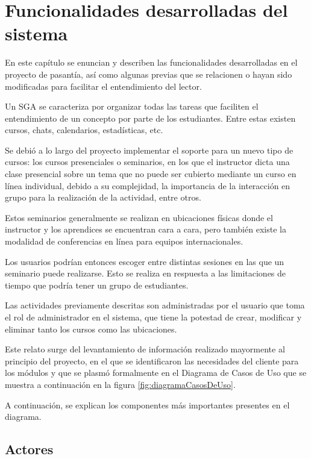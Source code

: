 \chapter{Funcionalidades desarrolladas del sistema}
\thispagestyle{empty} %
\glsresetall

En este capítulo se enuncian y describen las funcionalidades desarrolladas en el proyecto de pasantía, así como algunas previas que se relacionen o hayan sido modificadas para facilitar el entendimiento del lector.

Un \gls{SGA} se caracteriza por organizar todas las tareas que faciliten el entendimiento de un concepto por parte de los estudiantes. Entre estas existen cursos, chats, calendarios, estadísticas, etc.

Se debió a lo largo del proyecto implementar el soporte para un nuevo tipo de cursos: los cursos presenciales o seminarios, en los que el instructor dicta una clase presencial sobre un tema que no puede ser cubierto mediante un curso en línea individual, debido a su complejidad, la importancia de la interacción en grupo para la realización de la actividad, entre otros.

Estos seminarios generalmente se realizan en ubicaciones físicas donde el instructor y los aprendices se encuentran cara a cara, pero también existe la modalidad de conferencias en línea para equipos internacionales.

Los usuarios podrían entonces escoger entre distintas sesiones en las que un seminario puede realizarse. Esto se realiza en respuesta a las limitaciones de tiempo que podría tener un grupo de estudiantes.

Las actividades previamente descritas son administradas por el usuario que toma el rol de administrador en el sistema, que tiene la potestad de crear, modificar y eliminar tanto los cursos como las ubicaciones.

Este relato surge del levantamiento de información realizado mayormente al principio del proyecto, en el que se identificaron las necesidades del cliente para los módulos y que se plasmó formalmente en el Diagrama de Casos de Uso que se muestra a continuación en la figura \ref{fig:diagramaCasosDeUso}.


A continuación, se explican los componentes más importantes presentes en el diagrama.

	\section{Actores} %
	\label{sec:usuarios}

